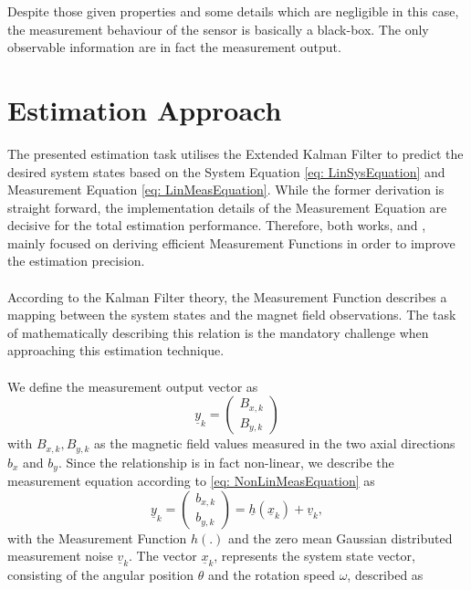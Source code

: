 \documentclass[english]{isasthesis}
\begin{document}
          Despite those given properties and some details which are negligible in this case, the measurement behaviour of the sensor is basically a black-box. The only observable information are in fact the measurement output.
    	\section{Estimation Approach}\label{estimation approach}
    	The presented estimation task utilises the Extended Kalman Filter to predict the desired system states based on the System Equation \eqref{eq: LinSysEquation} and Measurement Equation \eqref{eq: LinMeasEquation}. While the former derivation is straight forward, the implementation details of the Measurement Equation are decisive for the total estimation performance. Therefore, both works, \cite{fabian} and \cite{mariana}, mainly focused on deriving efficient Measurement Functions in order to improve the estimation precision. \\ \\
    	According to the Kalman Filter theory, the Measurement Function describes a mapping between the system states and the magnet field observations. The task of mathematically describing this relation is the mandatory challenge when approaching this estimation technique.\\ \\
    	 We define the measurement output vector as 
    	\begin{equation}
    		\underline{y}_k = \begin{pmatrix}B_{x,k}\\B_{y,k}\end{pmatrix}
    	\end{equation}
    	with $B_{x,k},B_{y,k}$ as the magnetic field values measured in the two axial directions $b_x$ and $b_y$. Since the relationship is in fact non-linear, we describe the measurement equation according to \eqref{eq: NonLinMeasEquation} as
    	\begin{equation}
    		\underline{y}_k = \begin{pmatrix}b_{x,k}\\b_{y,k}\end{pmatrix} = \underline{h}(\underline{x}_k) + \underline{v}_k,
    	\end{equation}
    	with the Measurement Function $h(.)$ and the zero mean Gaussian distributed measurement noise $\underline{v}_k$. The vector $\underline{x}_k$, represents the system state vector, consisting of the angular position $\theta$ and the rotation speed $\omega$, described as
\end{document}
